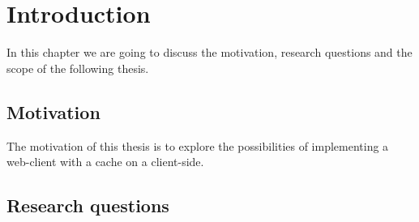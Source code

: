 \chapter{Introduction}
\label{Introduction}

In this chapter we are going to discuss the motivation, research questions and the scope of the following thesis.

\section{Motivation}

The motivation of this thesis is to explore the possibilities of implementing a web-client with a cache on a client-side. 

\section{Research questions}